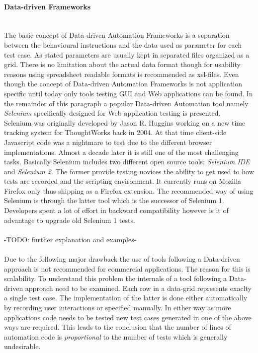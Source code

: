 \documentclass[12pt, notitlepage]{article}
\begin{document}
\paragraph{Data-driven Frameworks} ~\\
The basic concept of Data-driven Automation Frameworks is a separation between the behavioural instructions and the data used as parameter for each test case. 
As \cite{record-playback} stated parameters are usually kept in separated files organized as a grid. There is no limitation about the actual data format though
for usability reasons using spreadsheet readable formats is recommended as xsl-files. Even though the concept of Data-driven Automation Frameworks is not application specific until today only tools testing GUI and Web applications can be found. In the remainder of this paragraph a popular Data-driven Automation
tool namely \textit{Selenium}\cite{selenium} specifically designed for Web application testing is presented.\\
Selenium was originally developed by Jason R. Huggins working on a new time tracking system for ThoughtWorks back in 2004\cite{shortcut-selenium}.
At that time client-side Javascript code was a nightmare to test due to the different browser implementations. Almost a decade later it is still one of 
the most challenging tasks. Basically Selenium includes two different open source tools: \textit{Selenium IDE} and \textit{Selenium 2}. 
The former provide testing novices the ability to get used to how tests are recorded and the scripting environment. It currently runs on Mozilla Firefox only thus
shipping as a Firefox extension. The recommended way of using Selenium is through the latter tool which is the successor of Selenium 1. Developers spent a lot of
effort in backward compatibility however is it of advantage to upgrade old Selenium 1 tests. \\\\
-TODO: further explanation and examples-\\\\
Due to the following major drawback the use of tools following a Data-driven approach is not recommended for commercial applications. The reason for this
is scalability. To understand this problem the internals of a tool following a Data-driven approach need to be examined. Each row in a data-grid represents exaclty 
a single test case. The implementation of the latter is done either automatically by recording user interactions or specified manually.
In either way as more applications code needs to be tested new test cases generated in one of the above ways are required. 
This leads to the conclusion that the number of lines of automation code is \textit{proportional} to the number of tests\cite{record-playback} which is generally 
undesirable. 
\end{document}
